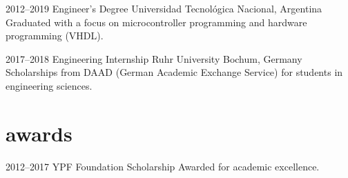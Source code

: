 \documentclass[a4paper,nocolors]{friggeri-cv}
\begin{document}
\begin{entrylist}


\entry
{2012--2019}
{Engineer’s Degree}
{Universidad Tecnológica Nacional, Argentina}
{Graduated with a focus on microcontroller programming and hardware programming (VHDL).}


\entry
{2017--2018}
{Engineering Internship}
{Ruhr University Bochum, Germany}
{Scholarships from DAAD (German Academic Exchange Service) for students in engineering sciences.}

\end{entrylist}

\vspace{-1em}
\section{awards}

\begin{entrylist}


\entry
{2012–2017}
{YPF Foundation Scholarship}
{Awarded for academic excellence.}

\end{entrylist}



\end{document}
